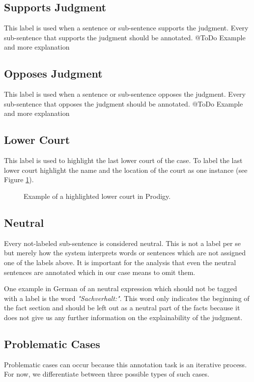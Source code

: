 \documentclass{article}
\begin{document}
\subsection{Supports Judgment}
This label is used when a sentence or sub-sentence supports the judgment. Every sub-sentence that supports the judgment should be annotated.
@ToDo Example and more explanation

\subsection{Opposes Judgment}
This label is used when a sentence or sub-sentence opposes the judgment. Every sub-sentence that opposes the judgment should be annotated.
@ToDo Example and more explanation

\subsection{Lower Court}
This label is used to highlight the last lower court of the case. To label the last lower court highlight the name and the location of the court  as one instance (see Figure \ref{lower-court}).
\begin{figure}[h]
     \caption{Example of a highlighted lower court in Prodigy.}
     \label{lower-court}
\end{figure}
\pagebreak

\subsection{Neutral}
Every not-labeled sub-sentence is considered neutral. This is not a label per se but merely how the system interprets words or sentences which are not assigned one of the labels above. It is important for the analysis that even the neutral sentences are annotated which in our case means to omit them.

One example in German of an neutral expression which should not be tagged with a label is the word \emph{"Sachverhalt:"}. This word only indicates the beginning of the fact section and should be left out as a neutral part of the facts because it does not give us any further information on the explainability of the judgment. 

\subsection{Problematic Cases}
Problematic cases can occur because this annotation task is an iterative process. For now, we differentiate between three possible types of such cases.
\end{document}
